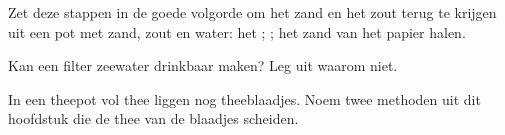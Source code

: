 \begin{exercise}[$\star$]\label{exo:g3:separating-mixtures:9}
Zet deze stappen in de goede volgorde om het zand en het zout terug te
krijgen uit een pot met zand, zout en water: het  ;
; het zand van het papier halen.
\end{exercise}

\begin{exercise}[$\star\star$]\label{exo:g3:separating-mixtures:10}
Kan een filter zeewater drinkbaar maken? Leg uit waarom niet.
\end{exercise}

\begin{exercise}[$\star\star$]\label{exo:g3:separating-mixtures:11}
In een theepot vol thee liggen nog theeblaadjes. Noem twee methoden uit
dit hoofdstuk die de thee van de blaadjes scheiden.
\end{exercise}
